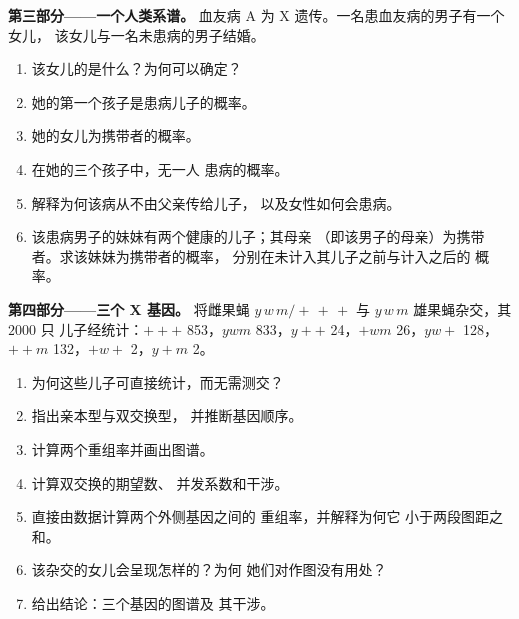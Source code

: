\begin{problem}
\medskip
\noindent\textbf{第三部分——一个人类系谱。}
血友病 A 为 X 遗传。一名患血友病的男子有一个女儿，
该女儿与一名未患病的男子结婚。
\begin{enumerate}[resume]
  \item 该女儿的是什么？为何可以确定？
  \item 她的第一个孩子是患病儿子的概率。
  \item 她的女儿为携带者的概率。
  \item 在她的三个孩子中，无一人
        患病的概率。
  \item 解释为何该病从不由父亲传给儿子，
        以及女性如何会患病。
  \item 该患病男子的妹妹有两个健康的儿子；其母亲
        （即该男子的母亲）为携带者。求该妹妹为携带者的概率，
        分别在未计入其儿子之前与计入之后的
        概率。
\end{enumerate}

\medskip
\noindent\textbf{第四部分——三个 X 基因。}
将雌果蝇 $y\,w\,m/+\,+\,+$ 与 $y\,w\,m$ 雄果蝇杂交，其 $2000$ 只
儿子经统计：$+++$ 853，$ywm$ 833，$y++$ 24，$+wm$ 26，$yw+$ 128，
$++m$ 132，$+w+$ 2，$y+m$ 2。
\begin{enumerate}[resume]
  \item 为何这些儿子可直接统计，而无需测交？
  \item 指出亲本型与双交换型，
        并推断基因顺序。
  \item 计算两个重组率并画出图谱。
  \item 计算双交换的期望数、
        并发系数和干涉。
  \item 直接由数据计算两个外侧基因之间的
        重组率，并解释为何它
        小于两段图距之和。
  \item 该杂交的女儿会呈现怎样的？为何
        她们对作图没有用处？
  \item 给出结论：三个基因的图谱及
        其干涉。
\end{enumerate}
\end{problem}
